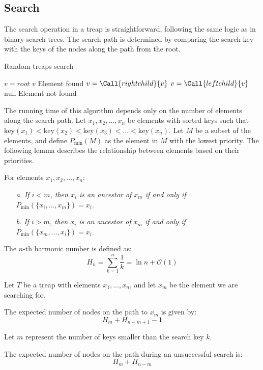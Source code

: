 \subsection{Search}
The search operation in a treap is straightforward, following the same logic as in binary search trees. 
The search path is determined by comparing the search key with the keys of the nodes along the path from the root.
\begin{algorithm}[H]
    \caption{Random treaps search}
    \begin{algorithmic}[1]
        \State $v = root$
                \State \Return $v$ \Comment Element found
            \EndIf
                \State $v = \Call{rightchild}{v}$
            \EndIf
                \State $v = \Call{leftchild}{v}$
            \EndIf
        \EndWhile
        \State \Return $\text{null}$ \Comment Element not found
    \end{algorithmic}
\end{algorithm}
The running time of this algorithm depends only on the number of elements along the search path.
Let $x_1, x_2,\dots, x_n$ be elements with sorted keys such that $\text{key}(x_1)<\text{key}(x_2) < \text{key}(x_3)< \dots <\text{key}(x_n)$. 
Let $M$ be a subset of the elements, and define $P_{\min}(M)$ as the element in $M$ with the lowest priority. 
The following lemma describes the relationship between elements based on their priorities.
\begin{lemma}
    For elements $x_1,x_2,\dots,x_n$: 
\end{lemma}
\begin{itemize}
    \item[\textit{a.}] \textit{If $i<m$, then $x_i$ is an ancestor of $x_m$ if and only if $P_{\min}(\{x_i,\dots,x_m\})=x_i$}. 
    \item[\textit{b.}] \textit{If $i>m$, then $x_i$ is an ancestor of $x_m$ if and only if $P_{\min}(\{x_m,\dots,x_i\})=x_i$}. 
\end{itemize}

\begin{definition}
    The $n$-th harmonic number is defined as:
    \[H_n=\sum_{k=1}^n\dfrac{1}{k}=\ln n + \mathcal{O}(1)\]    
\end{definition}
Let $T$ be a treap with elements $x_1, \dots, x_n$, and let $x_m$ be the element we are searching for.
\begin{lemma}
    The expected number of nodes on the path to $x_m$ is given by:
    \[H_{m}+H_{n-m+1}-1\]
\end{lemma}
Let $m$ represent the number of keys smaller than the search key $k$.
\begin{lemma}
    The expected number of nodes on the path during an unsuccessful search is:
    \[H_{m}+H_{n-m}\] 
\end{lemma}

